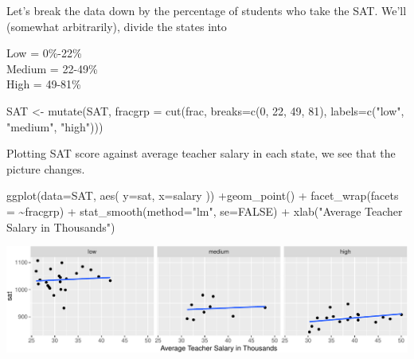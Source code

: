 \documentclass[
  letterpaper,
  DIV=11,
  numbers=noendperiod]{scrreprt}
\newenvironment{Shaded}{\begin{snugshade}}{\end{snugshade}}
\newcommand{\AttributeTok}[1]{\textcolor[rgb]{0.40,0.45,0.13}{#1}}
\newcommand{\ConstantTok}[1]{\textcolor[rgb]{0.56,0.35,0.01}{#1}}
\newcommand{\DecValTok}[1]{\textcolor[rgb]{0.68,0.00,0.00}{#1}}
\newcommand{\FunctionTok}[1]{\textcolor[rgb]{0.28,0.35,0.67}{#1}}
\newcommand{\NormalTok}[1]{\textcolor[rgb]{0.00,0.23,0.31}{#1}}
\newcommand{\OtherTok}[1]{\textcolor[rgb]{0.00,0.23,0.31}{#1}}
\newcommand{\SpecialCharTok}[1]{\textcolor[rgb]{0.37,0.37,0.37}{#1}}
\newcommand{\StringTok}[1]{\textcolor[rgb]{0.13,0.47,0.30}{#1}}
\begin{document}
Let's break the data down by the percentage of students who take the
SAT. We'll (somewhat arbitrarily), divide the states into

Low = 0\%-22\%\\
Medium = 22-49\%\\
High = 49-81\%

\begin{Shaded}
\begin{Highlighting}[]
\NormalTok{SAT }\OtherTok{\textless{}{-}} \FunctionTok{mutate}\NormalTok{(SAT, }\AttributeTok{fracgrp =} \FunctionTok{cut}\NormalTok{(frac, }
      \AttributeTok{breaks=}\FunctionTok{c}\NormalTok{(}\DecValTok{0}\NormalTok{, }\DecValTok{22}\NormalTok{, }\DecValTok{49}\NormalTok{, }\DecValTok{81}\NormalTok{), }
      \AttributeTok{labels=}\FunctionTok{c}\NormalTok{(}\StringTok{"low"}\NormalTok{, }\StringTok{"medium"}\NormalTok{, }\StringTok{"high"}\NormalTok{)))}
\end{Highlighting}
\end{Shaded}

Plotting SAT score against average teacher salary in each state, we see
that the picture changes.

\begin{Shaded}
\begin{Highlighting}[]
\FunctionTok{ggplot}\NormalTok{(}\AttributeTok{data=}\NormalTok{SAT, }\FunctionTok{aes}\NormalTok{( }\AttributeTok{y=}\NormalTok{sat, }\AttributeTok{x=}\NormalTok{salary )) }\SpecialCharTok{+}\FunctionTok{geom\_point}\NormalTok{() }\SpecialCharTok{+} \FunctionTok{facet\_wrap}\NormalTok{(}\AttributeTok{facets =} \SpecialCharTok{\textasciitilde{}}\NormalTok{fracgrp) }\SpecialCharTok{+}
\FunctionTok{stat\_smooth}\NormalTok{(}\AttributeTok{method=}\StringTok{"lm"}\NormalTok{, }\AttributeTok{se=}\ConstantTok{FALSE}\NormalTok{) }\SpecialCharTok{+} \FunctionTok{xlab}\NormalTok{(}\StringTok{"Average Teacher Salary in Thousands"}\NormalTok{)}
\end{Highlighting}
\end{Shaded}

\includegraphics{Ch5_files/figure-pdf/unnamed-chunk-35-1.pdf}
\end{document}
